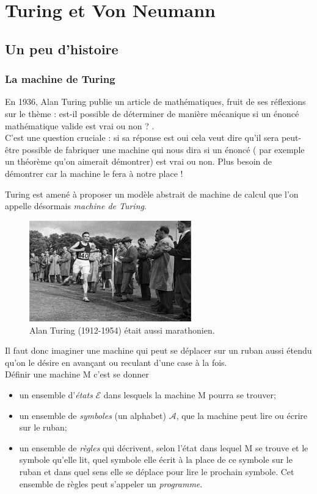 \chapter{Turing et Von Neumann}

\section{Un peu d'histoire}
\subsection{La machine de Turing}

En 1936, Alan Turing publie un article de mathématiques, fruit de ses réflexions sur le thème : \og est-il possible de déterminer de manière
mécanique si un énoncé mathématique valide est vrai ou non ? \fg{}.\\
C'est une question cruciale : si sa réponse est \og oui\fg{} cela veut dire qu'il sera peut-être possible de fabriquer une machine qui nous dira si
un énoncé ( par exemple un théorème qu'on aimerait démontrer) est vrai ou non. Plus besoin de démontrer car la machine le fera à notre place !

Turing est amené à proposer un modèle abstrait de machine de calcul que l'on appelle désormais \textit{machine de Turing}.

\begin{figure}[H]
\begin{center}
\includegraphics[width=7cm]{img/turing}
\end{center}
\caption*{Alan Turing (1912-1954) était aussi marathonien.}
\end{figure}

Il faut donc imaginer une machine qui peut se déplacer sur un ruban aussi étendu qu'on le désire en avançant ou reculant d'une case à la fois.\\
Définir une machine M c'est se donner
\begin{itemize}
    \item 	un ensemble d'\textit{états} $\mathcal{E}$ dans lesquels la machine M pourra se trouver;
    \item 	un ensemble de \textit{symboles} (un alphabet) $\mathcal{A}$, que la machine peut lire ou écrire sur le ruban;
    \item 	un ensemble de \textit{règles} qui décrivent, selon l'état dans lequel M se trouve et le symbole qu'elle lit, quel symbole elle écrit à
          la place de ce symbole sur le ruban et dans quel sens elle se déplace pour lire le prochain symbole. Cet ensemble de règles peut s'appeler un
          \textit{programme}.
\end{itemize}

